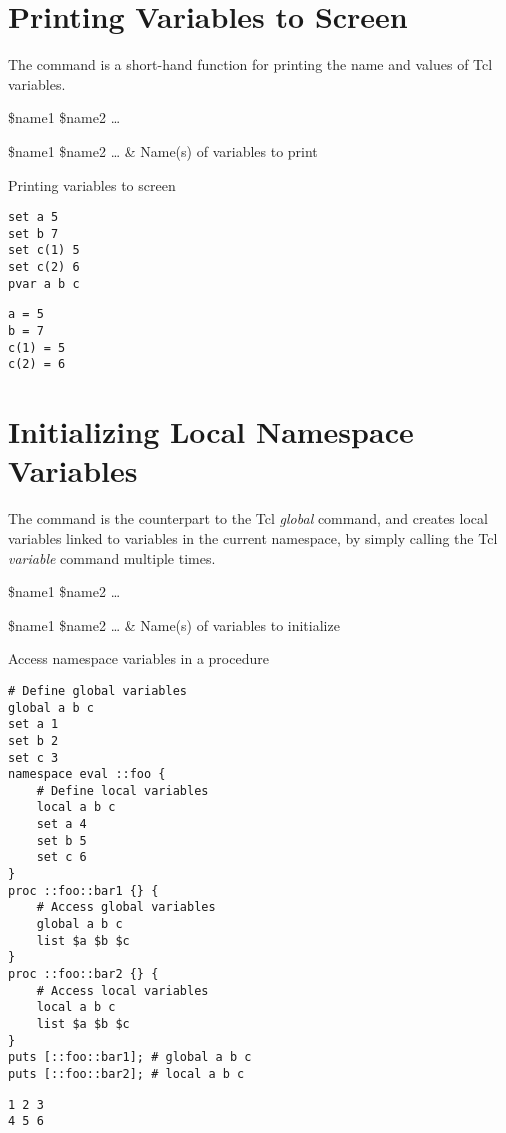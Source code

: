\documentclass{article}
\renewcommand{\^}[1]{\textsuperscript{#1}}
\renewcommand{\_}[1]{\textsubscript{#1}}
\begin{document}
\section{Printing Variables to Screen} 
The  command is a short-hand function for printing the name and values of Tcl variables.
\begin{syntax}
 \$name1 \$name2 …
\end{syntax}
\begin{args}
\$name1 \$name2 … & Name(s) of variables to print
\end{args}

\begin{example}{Printing variables to screen}
\begin{lstlisting}
set a 5
set b 7
set c(1) 5
set c(2) 6
pvar a b c
\end{lstlisting}
\tcblower
\begin{lstlisting}
a = 5
b = 7
c(1) = 5
c(2) = 6
\end{lstlisting}
\end{example}
\clearpage
\section{Initializing Local Namespace Variables}
The command  is the counterpart to the Tcl \textit{global} command, and creates local variables linked to variables in the current namespace, by simply calling the Tcl \textit{variable} command multiple times.
\begin{syntax}
 \$name1 \$name2 …
\end{syntax}
\begin{args}
\$name1 \$name2 … & Name(s) of variables to initialize
\end{args}
\begin{example}{Access namespace variables in a procedure}
\begin{lstlisting}
# Define global variables
global a b c
set a 1
set b 2
set c 3
namespace eval ::foo {
    # Define local variables
    local a b c
    set a 4
    set b 5
    set c 6
}
proc ::foo::bar1 {} {
    # Access global variables
    global a b c
    list $a $b $c
}
proc ::foo::bar2 {} {
    # Access local variables
    local a b c
    list $a $b $c
}
puts [::foo::bar1]; # global a b c
puts [::foo::bar2]; # local a b c
\end{lstlisting}
\tcblower
\begin{lstlisting}
1 2 3
4 5 6
\end{lstlisting}
\end{example}
\end{document}
